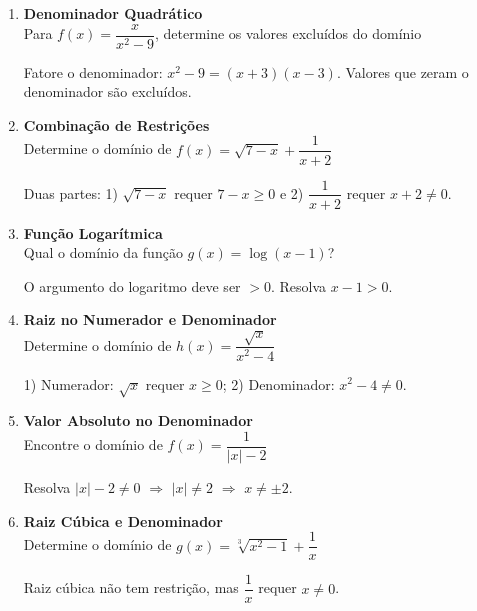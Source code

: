 \documentclass[11pt]{article}
\begin{document}
\begin{multicols}{2}
\begin{enumerate}
\item \textbf{Denominador Quadrático}\\
Para $f(x) = \dfrac{x}{x^2-9}$, determine os valores excluídos do domínio
\begin{tcolorbox}[colback=explanationbg,colframe=titleblue,title=Dica:]
Fatore o denominador: $x^2-9 = (x+3)(x-3)$. Valores que zeram o denominador são excluídos.
\end{tcolorbox}

\item \textbf{Combinação de Restrições}\\
Determine o domínio de $f(x) = \sqrt{7-x} + \dfrac{1}{x+2}$
\begin{tcolorbox}[colback=explanationbg,colframe=titleblue,title=Dica:]
Duas partes: 1) $\sqrt{7-x}$ requer $7-x \geq 0$ e 2) $\dfrac{1}{x+2}$ requer $x+2 \neq 0$.
\end{tcolorbox}

\item \textbf{Função Logarítmica}\\
Qual o domínio da função $g(x) = \log(x-1)$?
\begin{tcolorbox}[colback=explanationbg,colframe=titleblue,title=Dica:]
O argumento do logaritmo deve ser $> 0$. Resolva $x-1 > 0$.
\end{tcolorbox}

\item \textbf{Raiz no Numerador e Denominador}\\
Determine o domínio de $h(x) = \dfrac{\sqrt{x}}{x^2-4}$
\begin{tcolorbox}[colback=explanationbg,colframe=titleblue,title=Dica:]
1) Numerador: $\sqrt{x}$ requer $x \geq 0$; 2) Denominador: $x^2-4 \neq 0$.
\end{tcolorbox}

\item \textbf{Valor Absoluto no Denominador}\\
Encontre o domínio de $f(x) = \dfrac{1}{|x|-2}$
\begin{tcolorbox}[colback=explanationbg,colframe=titleblue,title=Dica:]
Resolva $|x|-2 \neq 0$ $\Rightarrow$ $|x| \neq 2$ $\Rightarrow$ $x \neq \pm2$.
\end{tcolorbox}

\item \textbf{Raiz Cúbica e Denominador}\\
Determine o domínio de $g(x) = \sqrt[3]{x^2-1} + \dfrac{1}{x}$
\begin{tcolorbox}[colback=explanationbg,colframe=titleblue,title=Dica:]
Raiz cúbica não tem restrição, mas $\dfrac{1}{x}$ requer $x \neq 0$.
\end{tcolorbox}


\end{enumerate}
\end{multicols}
\end{document}
